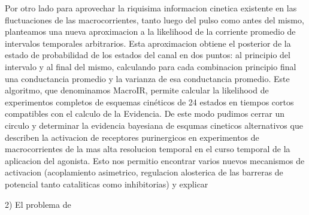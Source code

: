 \documentclass[pdflatex,sn-mathphys-num]{sn-jnl}%
\theoremstyle{thmstyleone}%
\theoremstyle{thmstyletwo}%
\theoremstyle{thmstylethree}%
\begin{document}
Por otro lado para aprovechar la riquisima informacion cinetica existente en las fluctuaciones de las macrocorrientes, tanto luego del pulso como antes del mismo, planteamos una nueva aproximacion a la likelihood de la corriente promedio de intervalos temporales arbitrarios. Esta aproximacion obtiene el posterior de la estado de probabilidad de los estados del canal en dos puntos: al principio del intervalo y al final del mismo, calculando para cada combinacion principio final una conductancia promedio y la varianza de esa conductancia promedio. Este algoritmo, que denominamos MacroIR, permite calcular la likelihood de experimentos completos de esquemas cinéticos de 24 estados en tiempos cortos compatibles con el calculo de la Evidencia. 
De este modo pudimos cerrar un circulo y determinar la evidencia bayesiana de esqumas cineticos alternativos que describen la activacion de receptores purinergicos en experimentos de macrocorrientes de la mas alta resolucion temporal en el curso temporal de la aplicacion del agonista. 
Esto nos permitio encontrar varios nuevos mecanismos de activacion (acoplamiento asimetrico, regulacion alosterica de las barreras de potencial tanto cataliticas como inhibitorias) y explicar 











2) El problema de  
\end{document}
